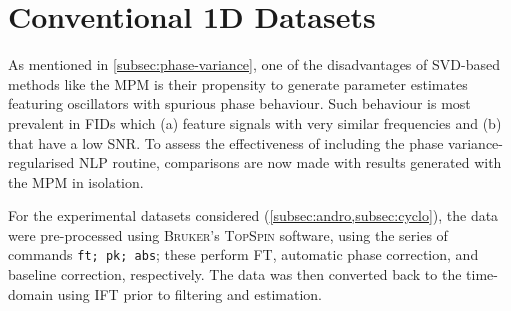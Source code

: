 \section{Conventional \ac{1D} Datasets}
\label{sec:evaluation}

As mentioned in \cref{subsec:phase-variance}, one of the disadvantages of
\ac{SVD}-based methods like the \ac{MPM} is their propensity to generate
parameter estimates featuring oscillators with spurious phase behaviour. Such
behaviour is most prevalent in \acp{FID} which (a) feature signals with very
similar frequencies and (b) that have a low \ac{SNR}.
To assess the effectiveness of including the phase variance-regularised
\ac{NLP} routine, comparisons are now made with results generated with the
\ac{MPM} in isolation.

For the experimental datasets considered (\cref{subsec:andro,subsec:cyclo}),
the data were pre-processed using \textsc{Bruker}'s \textsc{TopSpin} software,
using the series of commands \texttt{ft; pk; abs}; these perform \ac{FT},
automatic phase correction, and baseline correction, respectively.
The data was
then converted back to the time-domain using \ac{IFT} prior to filtering and
estimation. \label{corr:onedim-timings}

